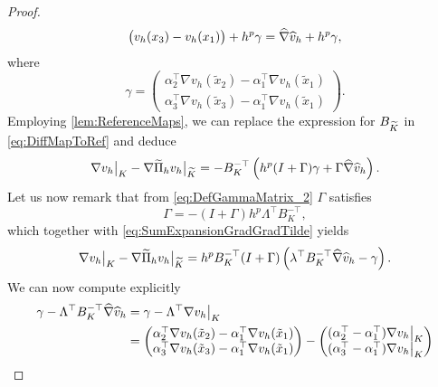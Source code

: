 \documentclass[10pt]{article}
\begin{document}
\begin{proof}
\begin{equation}
\begin{pmatrix}
								   					 v_h(x_3) - v_h(x_1) \end{pmatrix} + h^p \gamma
								   = \widehat \nabla \widehat v_h + h^p \gamma,
\end{equation}
where 
\begin{equation}
	\gamma = \begin{pmatrix} \alpha_2^\top \nabla v_h(\tilde x_2) - \alpha_1^\top \nabla v_h(\tilde x_1) \\
			 				 \alpha_3^\top \nabla v_h(\tilde x_3) - \alpha_1^\top \nabla v_h(\tilde x_1) \end{pmatrix}.
\end{equation}
Employing \cref{lem:ReferenceMaps}, we can replace the expression for $B_{\widetilde K}$ in \eqref{eq:DiffMapToRef} and deduce
\begin{equation}\label{eq:SumExpansionGradGradTilde}
	\nabla v_h\bigr\rvert_{K} - \nabla \widetilde \Pi_h v_h \bigr\rvert_{\widetilde K} = -B_K^{-\top}\left(h^p(I + \Gamma)\gamma + \Gamma \widehat \nabla \widehat v_h \right).
\end{equation}
Let us now remark that from \eqref{eq:DefGammaMatrix_2} $\Gamma$ satisfies 
\begin{equation}
	\Gamma = -(I + \Gamma)h^p\Lambda^\top B_K^{-\top},
\end{equation}
which together with \eqref{eq:SumExpansionGradGradTilde} yields
\begin{equation}\label{eq:SumExpansionGradGradTilde_2}
	\nabla v_h\bigr\rvert_{K} - \nabla \widetilde \Pi_h v_h \bigr\rvert_{\widetilde K} = h^p B_K^{-\top}(I + \Gamma)\left(\lambda^\top B_K^{-\top} \widehat \nabla \widehat v_h - \gamma\right).
\end{equation}
We can now compute explicitly 
\begin{equation}
\begin{aligned}
	\gamma - \Lambda^\top B_K^{-\top} \bhat \nabla \bhat v_h &= \gamma - \Lambda^\top \nabla v_h \eval{K} \\
	&= \begin{pmatrix}  \alpha_2^\top \nabla v_h(\tilde x_2) - \alpha_1^\top \nabla v_h(\tilde x_1) \\
						\alpha_3^\top \nabla v_h(\tilde x_3) - \alpha_1^\top \nabla v_h(\tilde x_1) \end{pmatrix}
	- \begin{pmatrix} (\alpha_2^\top - \alpha_1^\top) \nabla v_h \eval{K} \\ 
					  (\alpha_3^\top - \alpha_1^\top) \nabla v_h \eval{K} \end{pmatrix} \\

\end{aligned}
\end{equation}
\end{proof}
\end{document}
